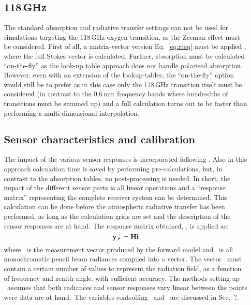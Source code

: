 \subsection{118\,GHz}
%
The standard absorption and radiative transfer settings can not be used for
simulations targeting the 118\,GHz oxygen transition, as the Zeeman effect must
be considered. First of all, a matrix-vector version Eq.~\ref{eq:rteq} must be
applied \citep{larsson:zeema:14}, where the full Stokes vector is calculated.
Further, absorption must be calculated ``on-the-fly'' as the look-up table
approach does not handle polarised absorption. However, even with an extension
of the lookup-tables, the ``on-the-fly'' option would still be to prefer as in
this case only the 118\,GHz transition itself must be considered (in contrast
to the 0.6\,mm frequency bands where hundredths of transitions must be summed
up) and a full calculation turns out to be faster than performing a
multi-dimensional interpolation.


\subsection{Sensor characteristics and calibration}
%
The impact of the various sensor responses is incorporated following
\citet{eriksson:06}. Also in this approach calculation time is saved by
performing pre-calculations, but, in contrast to the absorption tables, no
post-processing is needed. In short, the impact of the different sensor parts
is all linear operations and a ``response matrix'' representing the complete
receiver system can be determined. This calculation can be done before the
atmospheric radiative transfer has been performed, as long as the calculation
grids are set and the description of the sensor responses are at hand. The
response matrix obtained, \SnsMtr, is applied as:
\begin{equation}
  \label{eq:H}
  \mathbf{y}_{\mathcal{F}} = \mathbf{H}\mathbf{i}
\end{equation}
where \aMsrVct{\FrwMdl}\ is the measurement vector produced by the forward
model and \MpiVct\ is all monochromatic pencil beam radiances compiled into a
vector. The vector \MpiVct\ must contain a certain number of values to
represent the radiation field, as a function of frequency and zenith angle,
with sufficient accuracy. The methods setting up \SnsMtr\ assumes that both
radiances and sensor responses vary linear between the points were data are at
hand.\ The variables controlling
\SnsMtr\ and \MpiVct\ are discussed in Sec.~?.

